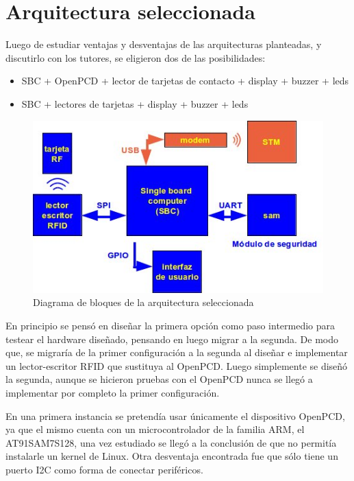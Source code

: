 \newpage
\section{Arquitectura seleccionada}
Luego de estudiar ventajas y desventajas de las arquitecturas planteadas, y discutirlo con los tutores, se eligieron dos de las posibilidades:

\begin{itemize}
\item SBC + OpenPCD + lector de tarjetas de contacto + display + buzzer + leds
\item SBC + lectores de tarjetas + display + buzzer + leds
\end{itemize}

\begin{figure}[H]
\centering
  \begin{center}
  \includegraphics[scale=.5]{Imagenes/arq_def.jpg} 
  \end{center}
  \caption{Diagrama de bloques de la arquitectura seleccionada}\label{Fig:HW} 
\end{figure}

En principio se pensó en diseñar la primera opción como paso intermedio para testear el hardware diseñado, pensando en luego migrar a la segunda. De modo que, se migraría de la primer configuración a la segunda al diseñar e implementar un lector-escritor RFID que sustituya al OpenPCD.
Luego simplemente se diseñó la segunda, aunque se hicieron pruebas con el OpenPCD nunca se llegó a implementar por completo la primer configuración.

En una primera instancia se pretendía usar únicamente el dispositivo OpenPCD, ya que el mismo cuenta con un microcontrolador de la familia ARM, el AT91SAM7S128, una vez estudiado se llegó a la conclusión de que no permitía instalarle un kernel de Linux. Otra desventaja encontrada fue que sólo tiene un puerto I2C como forma de conectar periféricos.

